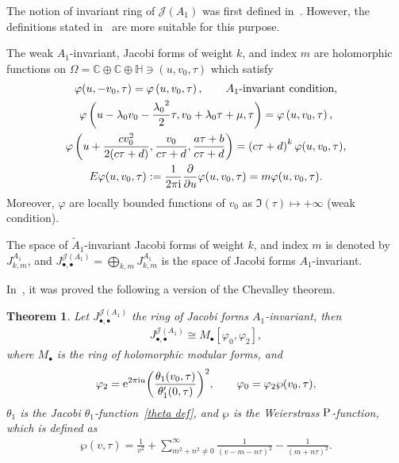 \documentclass[pdftex]{sigma}%
\numberwithin{equation}{section}
\newtheorem{Theorem}{Theorem}[section]
\newcommand{\Ja}{\mathcal{J}}
\begin{document}
The notion of invariant ring of $\Ja(A_1)$ was first defined in~\cite{M.EichlerandD.Zagier}. However, the definitions stated in~\cite{BertolaM.1, BertolaM.2, K.Wirthmuller} are more suitable for this purpose.
\begin{Definition}
\label{jacobi forms bertola}
The weak $ A_1$-invariant, Jacobi forms of weight $k$, and index $m$ are holomorphic functions on $\Omega=\mathbb{C}\oplus\mathbb{C}\oplus\mathbb{H}\ni (u,v_0,\tau)$ which satisfy
\begin{gather*}
\varphi(u,-v_0,\tau)=\varphi\left(u,v_0,\tau\right),\qquad \textrm{$A_1$-invariant condition},
\\
\varphi\left(u-\lambda_0v_0-\frac{{\lambda_0}^2}{2}\tau,v_0+\lambda_0\tau+\mu,\tau\right)
=\varphi\left(u,v_0,\tau\right),
\\
\varphi\left(u+\frac{cv_0^2}{2(c\tau+d)},\frac{v_0}{c\tau+d},\frac{a\tau+b}{c\tau+d}\right)
=\left(c\tau+d\right)^{k}\varphi(u,v_0,\tau),
\\
E\varphi(u,v_0,\tau):=\frac{1}{2\pi {\rm i}}\frac{\partial}{\partial u}\varphi(u,v_0,\tau)=m\varphi(u,v_0,\tau).
\end{gather*}
Moreover,
$\varphi$ are locally bounded functions of $v_0$ as $\Im(\tau)\mapsto +\infty$ (weak condition).

The space of $\tilde A_1$-invariant Jacobi forms of weight $k$, and index $m$ is denoted by $J_{k,m}^{A_1}$, and $J_{\bullet,\bullet}^{\Ja( A_1)}=\bigoplus _{k,m}J_{k,m}^{ A_1}$ is the space of Jacobi forms $ A_1$-invariant.
\end{Definition}
In~\cite{M.EichlerandD.Zagier}, it was proved the following a version of the Chevalley theorem.
\begin{Theorem}
Let $J_{\bullet,\bullet}^{\Ja( A_1)}$ the ring of Jacobi forms $ A_1$-invariant, then
\begin{gather*}
J_{\bullet,\bullet}^{\Ja( A_1)}\cong M_{\bullet}[\varphi_0,\varphi_2],
\end{gather*}
where $M_{\bullet}$ is the ring of holomorphic modular forms, and
\begin{gather*}
\varphi_2={\rm e}^{2\pi {\rm i} u}{\left(\frac{\theta_1(v_0,\tau)}{\theta_1^{\prime}(0,\tau)}\right)}^2,\qquad
\varphi_0=\varphi_2\wp(v_0,\tau),
\end{gather*}
 $\theta_1$ is the Jacobi $\theta_1$-function~\eqref{theta def}, and $\wp$ is the Weierstrass $\rm P$-function, which is defined as
\begin{gather}\label{Weiestrass P 0}
\wp(v,\tau)=\frac{1}{v^2}+\sum_{m^2+n^2\neq 0}^{\infty}\frac{1}{(v-m-n\tau)^2}-\frac{1}{(m+n\tau)^2}.
\end{gather}
\end{Theorem}
\end{document}
